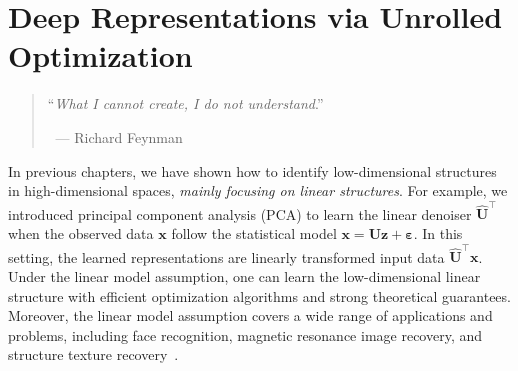 \documentclass[\toplevelprefix/book-main.tex]{subfiles}
\begin{document}
\chapter{Deep Representations via Unrolled Optimization}
\label{ch:representation}
\label{ch:unrolling}

\begin{quote}
\hfill    ``{\em What I cannot create, I do not understand}.''

$~$ \hfill --- Richard Feynman   
\end{quote}
\vspace{5mm}




In previous chapters, we have shown how to identify low-dimensional structures in high-dimensional spaces, \textit{mainly focusing on linear structures}. 
For example, we introduced principal component analysis (PCA) to learn the linear denoiser $\hat{\bm{U}}^{\top}$ when the observed data $\bm{x}$ follow the statistical model $\bm{x} = \bm{U}\bm{z} + \bm{\varepsilon}$. 
In this setting, the learned representations are linearly transformed input data $\hat{\bm{U}}^{\top}\bm{x}$.
Under the linear model assumption, one can learn the low-dimensional linear structure with efficient optimization algorithms and strong theoretical guarantees. 
Moreover, the linear model assumption covers a wide range of applications and problems, including face recognition, magnetic resonance image recovery, and structure texture recovery~\cite{Wright-Ma-2022}.
\end{document}
